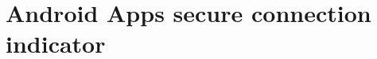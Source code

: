 \documentclass[a4paper, 12pt]{article}
\title{\vskip -3ex SSLProject: SSL/TLS Connection Indicator and Certificate Checker}
\author{\textit{Shuang Liang}}
\date{December 18, 2014}
\begin{document}
\maketitle
\tableofcontents
\clearpage

\section{Android Apps secure connection indicator}
\end{document}
